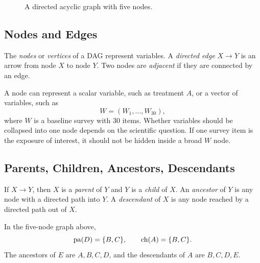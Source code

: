 \begin{figure}[H]
\centering
{}
\caption{A directed acyclic graph with five nodes.}
\end{figure}

\subsection{Nodes and Edges}

\begin{definition}
The \emph{nodes} or \emph{vertices} of a DAG represent variables. A \emph{directed edge} $X\to Y$ is an arrow from node $X$ to node $Y$. Two nodes are \emph{adjacent} if they are connected by an edge.
\end{definition}

A node can represent a scalar variable, such as treatment $A$, or a vector of variables, such as
\[
W=(W_1,\ldots,W_{30}),
\]
where $W$ is a baseline survey with 30 items. Whether variables should be collapsed into one node depends on the scientific question. If one survey item is the exposure of interest, it should not be hidden inside a broad $W$ node.

\subsection{Parents, Children, Ancestors, Descendants}

\begin{definition}
If $X\to Y$, then $X$ is a \emph{parent} of $Y$ and $Y$ is a \emph{child} of $X$. An \emph{ancestor} of $Y$ is any node with a directed path into $Y$. A \emph{descendant} of $X$ is any node reached by a directed path out of $X$.
\end{definition}

In the five-node graph above,
\[
\operatorname{pa}(D)=\{B,C\},
\qquad
\operatorname{ch}(A)=\{B,C\}.
\]
The ancestors of $E$ are $A,B,C,D$, and the descendants of $A$ are $B,C,D,E$.

